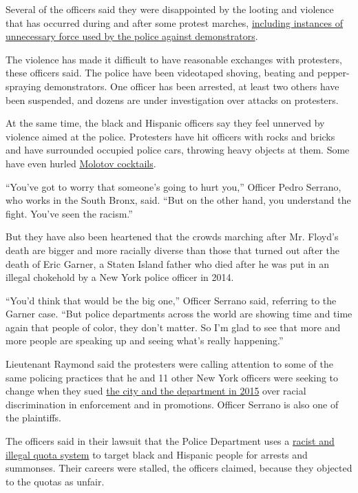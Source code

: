 Several of the officers said they were disappointed by the looting and
violence that has occurred during and after some protest marches,
\href{https://www.nytimes3xbfgragh.onion/2020/06/05/nyregion/police-kettling-protests-nyc.html}{including
instances of unnecessary force used by the police against
demonstrators}.

The violence has made it difficult to have reasonable exchanges with
protesters, these officers said. The police have been videotaped
shoving, beating and pepper-spraying demonstrators. One officer has been
arrested, at least two others have been suspended, and dozens are under
investigation over attacks on protesters.

At the same time, the black and Hispanic officers say they feel unnerved
by violence aimed at the police. Protesters have hit officers with rocks
and bricks and have surrounded occupied police cars, throwing heavy
objects at them. Some have even hurled
\href{https://www.nytimes3xbfgragh.onion/2020/06/07/nyregion/molotov-cocktail-lawyers-nyc.html}{Molotov
cocktails}.

``You've got to worry that someone's going to hurt you,'' Officer Pedro
Serrano, who works in the South Bronx, said. ``But on the other hand,
you understand the fight. You've seen the racism.''

But they have also been heartened that the crowds marching after Mr.
Floyd's death are bigger and more racially diverse than those that
turned out after the death of Eric Garner, a Staten Island father who
died after he was put in an illegal chokehold by a New York police
officer in 2014.

``You'd think that would be the big one,'' Officer Serrano said,
referring to the Garner case. ``But police departments across the world
are showing time and time again that people of color, they don't matter.
So I'm glad to see that more and more people are speaking up and seeing
what's really happening.''

Lieutenant Raymond said the protesters were calling attention to some of
the same policing practices that he and 11 other New York officers were
seeking to change when they sued
\href{https://www.nytimes3xbfgragh.onion/2016/02/21/magazine/a-black-police-officers-fight-against-the-nypd.html}{the
city and the department in 2015} over racial discrimination in
enforcement and in promotions. Officer Serrano is also one of the
plaintiffs.

The officers said in their lawsuit that the Police Department uses a
\href{https://www.nytimes3xbfgragh.onion/2019/12/06/nyregion/nyc-police-subway-racial-profiling.html}{racist
and illegal quota system} to target black and Hispanic people for
arrests and summonses. Their careers were stalled, the officers claimed,
because they objected to the quotas as unfair.

